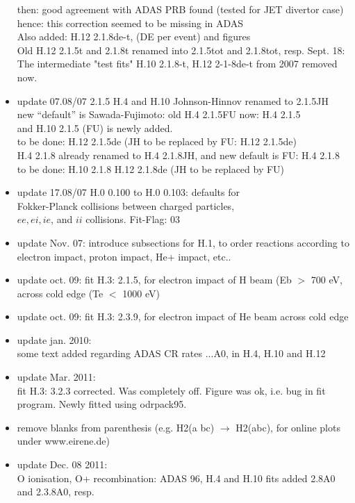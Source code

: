 \documentclass[12pt,dvipdfmx]{article}
\begin{document}
\begin{itemize}
  then: good agreement with ADAS PRB found (tested for JET divertor case)\\
  hence: this correction seemed to be missing in ADAS\\
  Also added: H.12 2.1.8de-t, (DE per event) and figures \\
  Old H.12 2.1.5t and 2.1.8t renamed into 2.1.5tot and 2.1.8tot, resp.
  Sept. 18: The intermediate "test fits" H.10 2.1.8-t, H.12 2-1-8de-t from 2007 removed now.
  \item update   07.08/07  2.1.5 H.4 and H.10 Johnson-Hinnov renamed to 2.1.5JH\\
  new ``default'' is Sawada-Fujimoto: old H.4 2.1.5FU now: H.4 2.1.5\\
  and H.10 2.1.5  (FU) is newly added.\\
  to be done: H.12 2.1.5de  (JH to be replaced by FU: H.12 2.1.5de)\\
  H.4 2.1.8 already renamed to H.4 2.1.8JH, and new default is FU: H.4 2.1.8\\
  to be done: H.10 2.1.8 H.12 2.1.8de  (JH to be replaced by FU)
  \item update   17.08/07  H.0 0.100 to H.0 0.103: defaults for \\
  Fokker-Planck collisions between charged particles,\\
  $ee, ei, ie$, and $ii$ collisions. Fit-Flag: 03
  \item update Nov. 07:  introduce subsections for H.1, to order
  reactions according to electron impact, proton impact, He+ impact, etc..
  \item update oct. 09:  fit H.3: 2.1.5, for electron impact
  of H beam (Eb $>$ 700 eV, across cold edge (Te $<$ 1000 eV)
  \item update oct. 09:  fit H.3: 2.3.9, for electron impact
  of He beam across cold edge
  \item update jan. 2010: \\
  some text added regarding ADAS CR rates
  ...A0, in H.4, H.10 and H.12
  \item update Mar. 2011:  \\
  fit H.3: 3.2.3 corrected. Was completely off.
  Figure was ok, i.e. bug in fit program. Newly fitted using odrpack95.
  \item remove blanks from parenthesis (e.g. H2(a bc) $\rightarrow$ H2(abc), for online plots under www.eirene.de)
  \item update Dec. 08 2011:  \\
  O ionisation, O+ recombination: ADAS 96, H.4 and H.10 fits added 2.8A0 and 2.3.8A0, resp.

\end{itemize}
\end{document}
